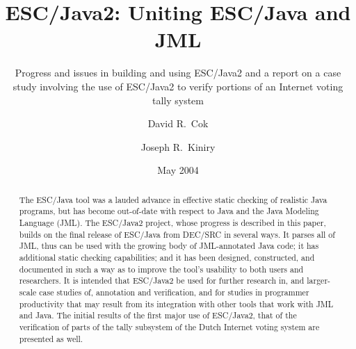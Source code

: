 \documentclass{llncs}
\newif\ifpdf
\begin{document}
\pagestyle{empty}

\mainmatter


\title{ESC/Java2: Uniting ESC/Java and JML}
\subtitle{Progress and issues in building and using ESC/Java2
and a report on a case study involving the use of ESC/Java2
to verify portions of an Internet voting tally system}

\author{David R.~Cok \and Joseph R.~Kiniry}
\date{May 2004}

\maketitle

\newcommand{\myhref}[2]{\ifpdf\href{#1}{#2}\else\htmladdnormallinkfoot{#2}{#1}\fi}

\begin{abstract}
  The ESC/Java tool was a lauded advance in effective static checking
  of realistic Java programs, but has become out-of-date with respect
  to Java and the Java Modeling Language (JML).  The ESC/Java2
  project, whose progress is described in this paper, builds on the
  final release of ESC/Java from DEC/SRC in several ways.  It parses
  all of JML, thus can be used with the growing body of JML-annotated
  Java code; it has additional static checking capabilities; and it
  has been designed, constructed, and documented in such a way as to
  improve the tool's usability to both users and researchers.  It is
  intended that ESC/Java2 be used for further research in, and
  larger-scale case studies of, annotation and verification, and for
  studies in programmer productivity that may result from its
  integration with other tools that work with JML and Java.  The
  initial results of the first major use of ESC/Java2, that of the
  verification of parts of the tally subsystem of the Dutch Internet
  voting system are presented as well.
\end{abstract}
\end{document}
